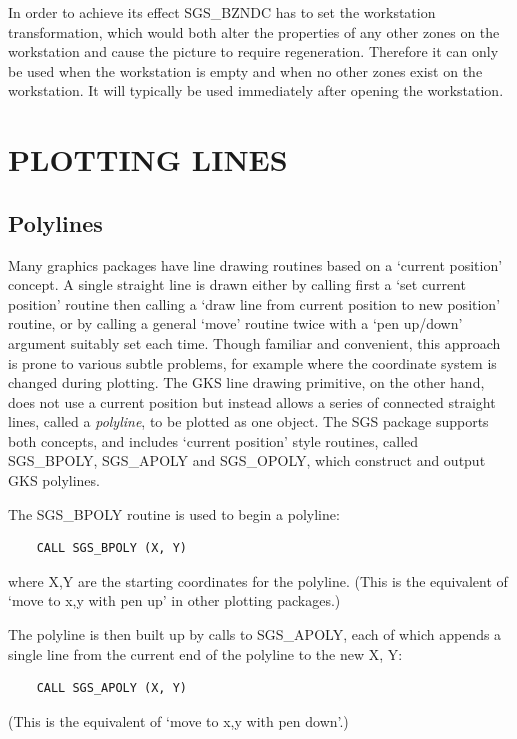 \documentclass[11pt]{article}
\newcommand{\htmlref}[2]{#1}
\begin{document}
In order to achieve its effect SGS\_BZNDC has to set the workstation
transformation, which would both alter the properties of any other zones
on the workstation and cause the picture to require regeneration. Therefore
it can only be used when the workstation is empty and when no other zones
exist on the workstation. It will typically be used immediately after opening
the workstation.

\section {PLOTTING LINES}\label{sec-lines}

\subsection {Polylines}
Many graphics packages have line drawing routines based on a
`current position' concept.  A single straight line
is drawn either by calling first a `set current position' routine
then calling a `draw line from current position to new
position' routine, or by calling a general `move' routine
twice with a `pen up/down' argument suitably set each time.  Though
familiar and convenient, this approach is prone to various
subtle problems, for example where the coordinate system is
changed during plotting.  The
GKS line drawing primitive,
on the other hand, does not use a current position but instead
allows a series of connected
straight lines, called a {\em polyline},
to be plotted as one object.  The SGS package supports both
concepts, and includes `current position' style routines,
called
\htmlref{SGS\_BPOLY}{SGS_BPOLY},
\htmlref{SGS\_APOLY}{SGS_APOLY} and
\htmlref{SGS\_OPOLY}{SGS_OPOLY},
which construct and output GKS polylines.

The SGS\_BPOLY
routine is used to begin a polyline:
\begin{verbatim}
    CALL SGS_BPOLY (X, Y)
\end{verbatim}
where X,Y are the starting coordinates for the polyline.  (This
is the equivalent of `move to x,y with pen up' in other
plotting packages.)

The polyline
is then built up by calls to SGS\_APOLY, each of which appends
a single line from the current end of the polyline
to the new X, Y:
\begin{verbatim}
    CALL SGS_APOLY (X, Y)
\end{verbatim}
(This is the equivalent of `move to x,y with pen down'.)
\end{document}
